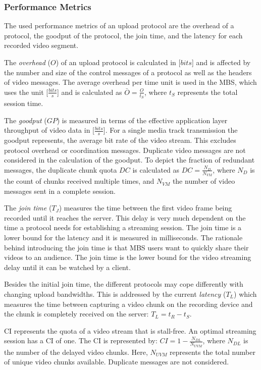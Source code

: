 \subsubsection{Performance Metrics}
\label{sec:520_metrics}
The used performance metrics of an upload protocol are the overhead of a protocol, the goodput of the protocol, the join time, and the latency for each recorded video segment.

The \textit{overhead} ($O$) of an upload protocol is calculated in [$bits$] and is affected by the number and size of the control messages of a protocol as well as the headers of video messages. 
The average overhead per time unit is used in the \ac{MBS}, which uses the unit [$\unit{\frac{bits}{s}}$] and is calculated as $\bar{O} = \unit{\frac{O}{t_{S}}}$, where $t_S$ represents the total session time.  

The \emph{goodput} ($GP$) is measured in terms of the effective application layer throughput of video data in [$\frac{bits}{s}$]. 
For a single media track transmission the goodput represents, the average bit rate of the video stream. 
This excludes protocol overhead or coordination messages.
Duplicate video messages are not considered in the calculation of the goodput. 
To depict the fraction of redundant messages, the duplicate chunk quota $DC$ is calculated as $DC = \frac{N_{D}}{N_{VM}}$, where $N_{D}$ is the count of chunks received multiple times, and $N_{VM}$ the number of video messages sent in a complete session.

The \textit{join time} ($T_{J}$) measures the time between the first video frame being recorded until it reaches the server.
This delay is very much dependent on the time a protocol needs for establishing a streaming session.
The join time is a lower bound for the latency and it is measured in milliseconds.
The rationale behind introducing the join time is that \ac{MBS} users want to quickly share their videos to an audience.
The join time is the lower bound for the video streaming delay until it can be watched by a client.

Besides the initial join time, the different protocols may cope differently with changing upload bandwidths.
This is addressed by the current \emph{latency} ($T_{L}$) which measures the time between capturing a video chunk on the recording device and the chunk is completely received on the server: $T_{L} = t_{R} - t_{S}$.

\ac{CI} represents the quota of a video stream that is stall-free.
An optimal streaming session has a \ac{CI} of one.
The \ac{CI} is represented by: $CI = 1 - \frac{N_{DL}}{N_{UVM}} $, where $N_{DL}$ is the number of the delayed video chunks.
Here, $N_{UVM}$ represents the total number of unique video chunks available. Duplicate messages are not considered.

